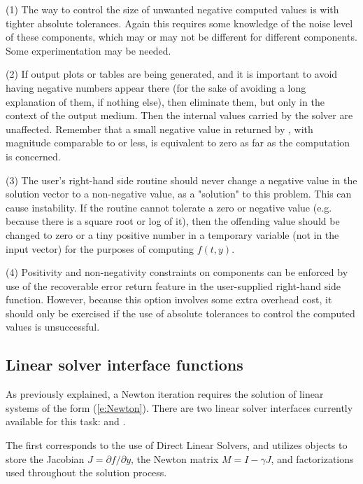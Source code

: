 (1) The way to control the size of unwanted negative computed values
is with tighter absolute tolerances.  Again this requires some
knowledge of the noise level of these components, which may or may not
be different for different components.  Some experimentation may be
needed.

(2) If output plots or tables are being generated, and it is important
to avoid having negative numbers appear there (for the sake of avoiding
a long explanation of them, if nothing else), then eliminate them, but
only in the context of the output medium.  Then the internal values carried
by the solver are unaffected.  Remember that a small negative value in 
returned by {\cvode}, with magnitude comparable to  or less,
is equivalent to zero as far as the computation is concerned.

(3) The user's right-hand side routine  should never change a
negative value in the solution vector  to a non-negative value,
as a "solution" to this problem.  This can cause instability.  If the
 routine cannot tolerate a zero or negative value (e.g. because
there is a square root or log of it), then the offending value should
be changed to zero or a tiny positive number in a temporary variable
(not in the input  vector) for the purposes of computing $f(t,y)$.

(4) Positivity and non-negativity constraints on components can be
enforced by use of the recoverable error return feature in the
user-supplied right-hand side function.  However, because this option
involves some extra overhead cost, it should only be exercised if the
use of absolute tolerances to control the computed values is
unsuccessful.

\subsection{Linear solver interface functions}\label{sss:lin_solv_init}

As previously explained, a Newton iteration requires the solution of
linear systems of the form (\ref{e:Newton}).  There are two {\cvode} linear
solver interfaces currently available for this task: {\cvdls} and {\cvspils}.

The first corresponds to the use of Direct Linear Solvers, and
utilizes {\sunmatrix} objects to store the Jacobian
$J = \partial{f}/\partial{y}$, the Newton matrix $M = I-\gamma J$, and
factorizations used throughout the solution process.

